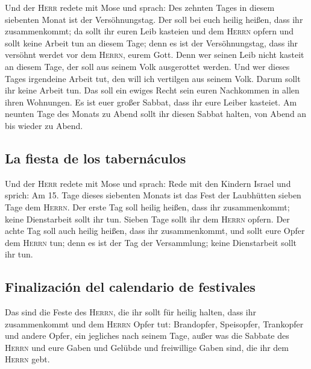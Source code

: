  Und der \textsc{Herr} redete mit Mose und sprach:
 Des zehnten Tages in diesem siebenten Monat ist der
Versöhnungstag. Der soll bei euch heilig heißen, dass ihr zusammenkommt;
da sollt ihr euren Leib kasteien und dem \textsc{Herrn} opfern
 und sollt keine Arbeit tun an diesem Tage; denn es ist
der Versöhnungstag, dass ihr versöhnt werdet vor dem \textsc{Herrn},
eurem Gott.  Denn wer seinen Leib nicht kasteit an diesem
Tage, der soll aus seinem Volk ausgerottet werden.  Und
wer dieses Tages irgendeine Arbeit tut, den will ich vertilgen aus
seinem Volk.  Darum sollt ihr keine Arbeit tun. Das soll
ein ewiges Recht sein euren Nachkommen in allen ihren Wohnungen.
 Es ist euer großer Sabbat, dass ihr eure Leiber
kasteiet. Am neunten Tage des Monats zu Abend sollt ihr diesen Sabbat
halten, von Abend an bis wieder zu Abend.

\hypertarget{la-fiesta-de-los-tabernuxe1culos}{%
\subsection{La fiesta de los
tabernáculos}\label{la-fiesta-de-los-tabernuxe1culos}}

 Und der \textsc{Herr} redete mit Mose und sprach:
 Rede mit den Kindern Israel und sprich: Am 15. Tage
dieses siebenten Monats ist das Fest der Laubhütten sieben Tage dem
\textsc{Herrn}.  Der erste Tag soll heilig heißen, dass
ihr zusammenkommt; keine Dienstarbeit sollt ihr tun. 
Sieben Tage sollt ihr dem \textsc{Herrn} opfern. Der achte Tag soll auch
heilig heißen, dass ihr zusammenkommt, und sollt eure Opfer dem
\textsc{Herrn} tun; denn es ist der Tag der Versammlung; keine
Dienstarbeit sollt ihr tun.

\hypertarget{finalizaciuxf3n-del-calendario-de-festivales}{%
\subsection{Finalización del calendario de
festivales}\label{finalizaciuxf3n-del-calendario-de-festivales}}

 Das sind die Feste des \textsc{Herrn}, die ihr sollt für
heilig halten, dass ihr zusammenkommt und dem \textsc{Herrn} Opfer tut:
Brandopfer, Speisopfer, Trankopfer und andere Opfer, ein jegliches nach
seinem Tage,  außer was die Sabbate des \textsc{Herrn}
und eure Gaben und Gelübde und freiwillige Gaben sind, die ihr dem
\textsc{Herrn} gebt.


